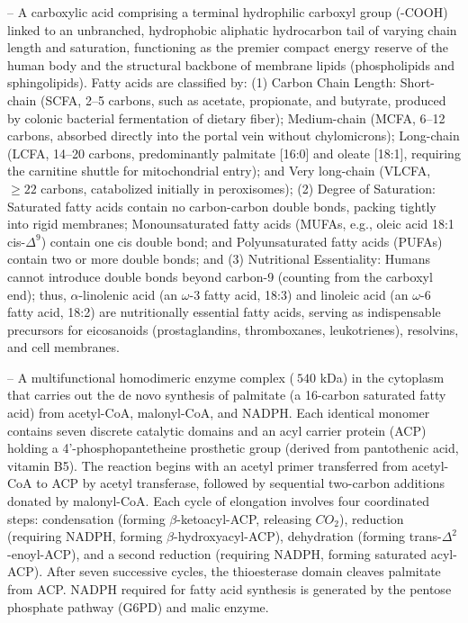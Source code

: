 -- A carboxylic acid comprising a terminal hydrophilic carboxyl group (-COOH) linked to an unbranched, hydrophobic aliphatic hydrocarbon tail of varying chain length and saturation, functioning as the premier compact energy reserve of the human body and the structural backbone of membrane lipids (phospholipids and sphingolipids). Fatty acids are classified by: (1) Carbon Chain Length: Short-chain (SCFA, 2--5 carbons, such as acetate, propionate, and butyrate, produced by colonic bacterial fermentation of dietary fiber); Medium-chain (MCFA, 6--12 carbons, absorbed directly into the portal vein without chylomicrons); Long-chain (LCFA, 14--20 carbons, predominantly palmitate [16:0] and oleate [18:1], requiring the carnitine shuttle for mitochondrial entry); and Very long-chain (VLCFA, $\ge 22$ carbons, catabolized initially in peroxisomes); (2) Degree of Saturation: Saturated fatty acids contain no carbon-carbon double bonds, packing tightly into rigid membranes; Monounsaturated fatty acids (MUFAs, e.g., oleic acid 18:1 cis-$\Delta^9$) contain one cis double bond; and Polyunsaturated fatty acids (PUFAs) contain two or more double bonds; and (3) Nutritional Essentiality: Humans cannot introduce double bonds beyond carbon-9 (counting from the carboxyl end); thus, $\alpha$-linolenic acid (an $\omega$-3 fatty acid, 18:3) and linoleic acid (an $\omega$-6 fatty acid, 18:2) are nutritionally essential fatty acids, serving as indispensable precursors for eicosanoids (prostaglandins, thromboxanes, leukotrienes), resolvins, and cell membranes.

-- A multifunctional homodimeric enzyme complex ($~540$ kDa) in the cytoplasm that carries out the de novo synthesis of palmitate (a 16-carbon saturated fatty acid) from acetyl-CoA, malonyl-CoA, and NADPH. Each identical monomer contains seven discrete catalytic domains and an acyl carrier protein (ACP) holding a 4'-phosphopantetheine prosthetic group (derived from pantothenic acid, vitamin B5). The reaction begins with an acetyl primer transferred from acetyl-CoA to ACP by acetyl transferase, followed by sequential two-carbon additions donated by malonyl-CoA. Each cycle of elongation involves four coordinated steps: condensation (forming $\beta$-ketoacyl-ACP, releasing $CO_2$), reduction (requiring NADPH, forming $\beta$-hydroxyacyl-ACP), dehydration (forming trans-$\Delta^2$-enoyl-ACP), and a second reduction (requiring NADPH, forming saturated acyl-ACP). After seven successive cycles, the thioesterase domain cleaves palmitate from ACP. NADPH required for fatty acid synthesis is generated by the pentose phosphate pathway (G6PD) and malic enzyme.

